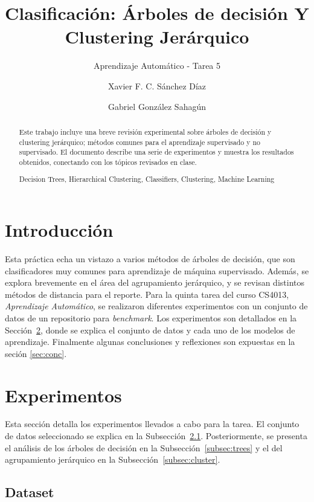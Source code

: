 \documentclass{llncs}
\title{Clasificación: Árboles de decisión Y Clustering Jerárquico}
\subtitle{Aprendizaje Automático - Tarea 5}
\author{Xavier F. C. Sánchez Díaz
\and Gabriel González Sahagún}
\institute{Tecnológico de Monterrey \\
\mailsa}
\newcommand{\keywords}[1]{\par\addvspace\baselineskip
\noindent\keywordname\enspace\ignorespaces#1}
\begin{document}
\maketitle
\begin{abstract}
Este trabajo incluye una breve revisión experimental sobre árboles de decisión y clustering jerárquico;
métodos comunes para el aprendizaje supervisado y no supervisado.
El documento describe una serie de experimentos y muestra los resultados obtenidos,
conectando con los tópicos revisados en clase.
\keywords{Decision Trees, Hierarchical Clustering, Classifiers, Clustering, Machine Learning}
\end{abstract}

\section{Introducción}
\label{sec:intro}

Esta práctica echa un vistazo a varios métodos de árboles de decisión, 
que son clasificadores muy comunes para aprendizaje de máquina supervisado.
Además, se explora brevemente en el área del agrupamiento jerárquico,
y se revisan distintos métodos de distancia para el reporte.
Para la quinta tarea del curso CS4013, \textit{Aprendizaje Automático},
se realizaron diferentes experimentos con un conjunto de datos de un repositorio para \textit{benchmark}.
Los experimentos son detallados en la Sección~\ref{sec:exp},
donde se explica el conjunto de datos y cada uno de los modelos de aprendizaje.
Finalmente algunas conclusiones y reflexiones son expuestas en la seción \ref{sec:conc}.

\section{Experimentos}
\label{sec:exp}

Esta sección detalla los experimentos llevados a cabo para la tarea.
El conjunto de datos seleccionado se explica en la Subsección~\ref{subsec:dataset}.
Posteriormente, se presenta el análisis de los árboles de decisión en la Subsección~\ref{subsec:trees}
y el del agrupamiento jerárquico en la Subsección~\ref{subsec:cluster}.

\subsection{Dataset}
\label{subsec:dataset}
\end{document}
